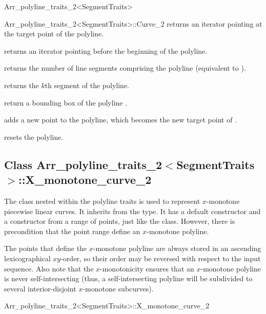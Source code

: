 \begin{ccRefClass}{Arr_polyline_traits_2<SegmentTraits>}
\begin{ccClass}{Arr_polyline_traits_2<SegmentTraits>::Curve_2}
  {returns an iterator pointing at the target point of the polyline.}

  {returns an iterator pointing before the beginning of the polyline.}

  {returns the number of line segments comprising the polyline
   (equivalent to ).}

  {returns the $k$th segment of the polyline.
   }

  {return a bounding box of the polyline \ccVar{}.}

\ccOperations

  {adds a new point to the polyline, which becomes the new target point
   of \ccVar{}.}

  {resets the polyline.}

\end{ccClass}

\subsection*{Class 
  Arr\_polyline\_traits\_2$<$SegmentTraits$>$::X\_monotone\_curve\_2}

The  class nested within the polyline traits is used
to represent $x$-monotone piecewise linear curves. It inherits from the
 type. It has a default constructor and a constructor from a
range of points, just like the  class. However, there is
precondition that the point range define an $x$-monotone polyline.

The points that define the $x$-monotone polyline are
always stored in an ascending lexicographical $xy$-order, so their order may
be reversed with respect to the input sequence. Also note that the
$x$-monotonicity ensures that an $x$-monotone polyline is never
self-intersecting (thus, a self-intersecting polyline will be subdivided
to several interior-disjoint $x$-monotone subcurves).

\begin{ccClass}{Arr_polyline_traits_2<SegmentTraits>::X_monotone_curve_2}
\end{ccClass}

\ccSeeAlso
    \\
    \\

\end{ccRefClass}
\ccRefPageEnd
